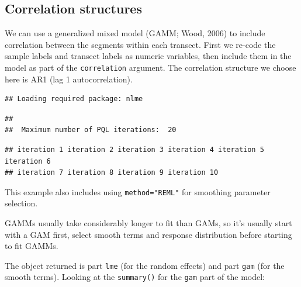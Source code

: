 \documentclass[]{amsart}
\newenvironment{Shaded}{}{}
\newcommand{\KeywordTok}[1]{\textcolor[rgb]{0.00,0.44,0.13}{\textbf{{#1}}}}
\newcommand{\DataTypeTok}[1]{\textcolor[rgb]{0.56,0.13,0.00}{{#1}}}
\newcommand{\StringTok}[1]{\textcolor[rgb]{0.25,0.44,0.63}{{#1}}}
\newcommand{\NormalTok}[1]{{#1}}
\begin{document}
\subsection{Correlation structures}

We can use a generalized mixed model (GAMM; Wood, 2006) to include
correlation between the segments within each transect. First we re-code
the sample labels and transect labels as numeric variables, then include
them in the model as part of the \texttt{correlation} argument. The
correlation structure we choose here is AR1 (lag 1 autocorrelation).

\begin{Shaded}
\end{Shaded}

\begin{verbatim}
## Loading required package: nlme
\end{verbatim}

\begin{verbatim}
## 
##  Maximum number of PQL iterations:  20
\end{verbatim}

\begin{verbatim}
## iteration 1 iteration 2 iteration 3 iteration 4 iteration 5 iteration 6
## iteration 7 iteration 8 iteration 9 iteration 10
\end{verbatim}

This example also includes using \texttt{method="REML"} for smoothing
parameter selection.

GAMMs usually take considerably longer to fit than GAMs, so it's usually
start with a GAM first, select smooth terms and response distribution
before starting to fit GAMMs.

The object returned is part \texttt{lme} (for the random effects) and
part \texttt{gam} (for the smooth terms). Looking at the
\texttt{summary()} for the \texttt{gam} part of the model:
\end{document}
